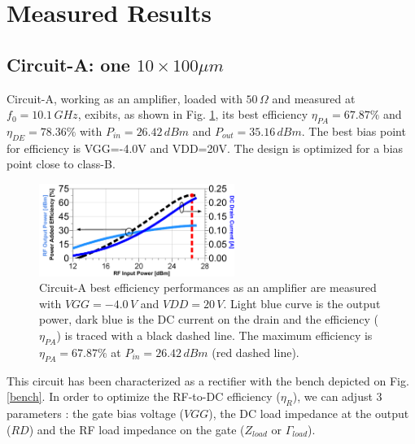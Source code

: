 \documentclass[conference]{IEEEtran}
\begin{document}
\section{Measured Results}

\subsection{Circuit-A: one $10\times100\mu m$}
Circuit-A, working as an amplifier, loaded with $50\,\Omega$ and measured at $f_0=10.1\,GHz$, exibits, as shown in Fig. \ref{mike_amp}, its best efficiency $\eta_{PA}=67.87\%$ and $\eta_{DE}=78.36\%$ with $P_{in}=26.42\,dBm$ and  $P_{out}=35.16\,dBm$. The best bias point for efficiency is VGG=-4.0V and VDD=20V. The design is optimized for a bias point close to class-B.

\begin{figure}[ht!] %
\centering
\includegraphics[width=2.5in]{IMS2014_Mike_Amplifier.pdf}
\caption{ Circuit-A best efficiency performances as an amplifier are measured with $VGG=-4.0\,V$ and $VDD=20\,V$. Light blue curve is the output power, dark blue is the DC current on the drain and the efficiency ($\eta_{PA}$) is traced with a black dashed line. The maximum efficiency is $\eta_{PA}=67.87\%$ at $P_{in}=26.42\,dBm$ (red dashed line).}
\label{mike_amp}
\end{figure}

This circuit has been characterized as a rectifier with the bench depicted on Fig. \ref{bench}. In order to optimize the RF-to-DC efficiency ($\eta_R$), we can adjust 3 parameters : the gate bias voltage ($VGG$), the DC load impedance at the output ($RD$) and the RF load impedance on the gate ($Z_{load}$ or $\Gamma_{load}$). \\
\end{document}
